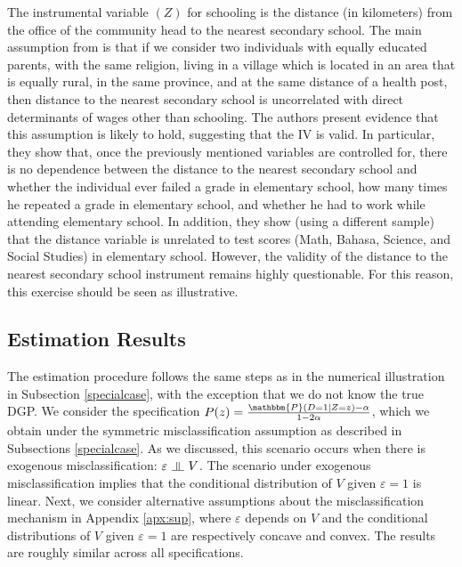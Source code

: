 \documentclass[11pt,reqno]{amsart}
\newcommand{\indep}{\rotatebox[origin=c]{90}{$\models$}}
\theoremstyle{plain}
\numberwithin{equation}{section}
\begin{document}
The instrumental variable $(Z)$ for schooling is the distance (in kilometers) from the office of the community head to the nearest secondary school. The main assumption from \cite{Carneiroal2017} is that if we consider two individuals with equally educated parents, with the same religion, living in a village which is located in an area that is equally rural, in the same province, and at the same distance of a health post, then distance to the nearest secondary school is uncorrelated with direct determinants of wages other than schooling. 
The authors present evidence that this assumption is likely to hold, suggesting that the IV is valid. In particular, they show that, once the previously mentioned variables are controlled for, there is no dependence between the distance to the nearest secondary school and whether the individual ever failed a grade in elementary school, how many times he repeated a grade in elementary school, and whether he had to work while attending elementary school. In addition, they show (using a different sample) that the distance variable is unrelated to test scores (Math, Bahasa, Science, and Social Studies) in elementary school.  However, the validity of the distance to the nearest secondary school instrument remains highly questionable. For this reason, this exercise should be seen as illustrative.

\subsection*{Estimation Results}
The estimation procedure follows the same steps as in the numerical illustration in Subsection \ref{specialcase}, with the exception that we do not know the true DGP.
We consider the specification $P(z)=\frac{\mathbbm{P}(D=1 \vert Z=z)-\alpha}{1-2 \alpha}$, which we obtain under the symmetric misclassification assumption as described in Subsections \ref{specialcase}. As we discussed, this scenario occurs when there is exogenous misclassification:  $\varepsilon\ \indep\ V$. The scenario under exogenous misclassification implies that the conditional distribution of $V$ given $\varepsilon=1$ is linear. 
Next, we consider alternative assumptions about the misclassification mechanism in Appendix \ref{apx:sup}, where $\varepsilon$ depends on $V$ and the conditional distributions of $V$ given $\varepsilon=1$ are respectively concave and convex. The results are roughly similar across all specifications. %
\end{document}
